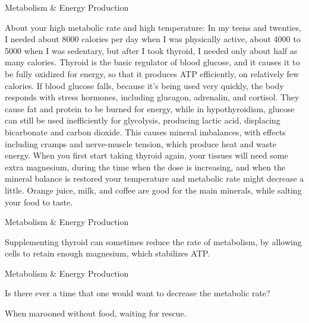 \documentclass[11pt,oneside,openany,extrafontsizes]{memoir}
\begin{document}
\begin{standalonequote}{Metabolism \& Energy Production}

    \begin{answer}
        About your high metabolic rate and high temperature: In my teens and twenties, I needed about 8000 calories per day when I was physically active, about 4000 to 5000 when I was sedentary, but after I took thyroid, I needed only about half as many calories. Thyroid is the basic regulator of blood glucose, and it causes it to be fully oxidized for energy, so that it produces ATP efficiently, on relatively few calories. If blood glucose falls, because it's being used very quickly, the body responds with stress hormones, including glucagon, adrenalin, and cortisol. They cause fat and protein to be burned for energy, while in hypothyroidism, glucose can still be used inefficiently for glycolysis, producing lactic acid, displacing bicarbonate and carbon dioxide. This causes mineral imbalances, with effects including cramps and nerve-muscle tension, which produce heat and waste energy. When you first start taking thyroid again, your tissues will need some extra magnesium, during the time when the dose is increasing, and when the mineral balance is restored your temperature and metabolic rate might decrease a little. Orange juice, milk, and coffee are good for the main minerals, while salting your food to taste.
    \end{answer}
\end{standalonequote}

\begin{standalonequote}{Metabolism \& Energy Production}

    \begin{answer}
        Supplementing thyroid can sometimes reduce the rate of metabolism, by allowing cells to retain enough magnesium, which stabilizes ATP.
    \end{answer}
\end{standalonequote}

\begin{qaexchange}{Metabolism \& Energy Production}

    \begin{question}
        Is there ever a time that one would want to decrease the metabolic rate?
    \end{question}

    \begin{answer}
        When marooned without food, waiting for rescue.
    \end{answer}
\end{qaexchange}
\end{document}
